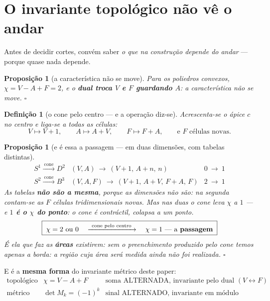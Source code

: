 \documentclass[11pt,a4paper]{article}
\newtheorem{proposicao}[teorema]{Proposição}
\newtheorem{definicao}{Definição}
\begin{document}
\section{O invariante topológico não vê o andar}\label{sec:euler}

Antes de decidir cortes, convém saber \emph{o que na construção depende do andar} ---
porque quase nada depende.

\begin{proposicao}[a característica não se move]\label{prop:euler}
Para os poliedros convexos, $\chi=V-A+F=2$, e o \textbf{dual troca $V$ e $F$
guardando $A$}: a característica não se move. $\square$
\end{proposicao}

\begin{definicao}[o cone pelo centro --- e a operação diz-se]\label{def:cone-centro}
Acrescenta-se o ápice $c$ no centro e liga-se a todas as células:
\[
V\mapsto V+1,\qquad A\mapsto A+V,\qquad F\mapsto F+A,
\qquad\text{e } F \text{ células novas.}
\]
\end{definicao}

\begin{proposicao}[e é essa a passagem --- em duas dimensões, com tabelas
distintas]\label{prop:passagem}
\[
\boxed{
\begin{array}{lll}
S^{1}\xrightarrow{\ \text{cone}\ }D^{2}
 & (V,A)\ \to\ (V{+}1,\,A{+}n,\,n)
 & 0\ \longrightarrow\ 1\\[3pt]
S^{2}\xrightarrow{\ \text{cone}\ }B^{3}
 & (V,A,F)\ \to\ (V{+}1,\,A{+}V,\,F{+}A,\,F)
 & 2\ \longrightarrow\ 1
\end{array}}
\]
As tabelas \textbf{não são a mesma}, porque as dimensões não são: na segunda
contam-se as $F$ células tridimensionais novas. Mas nas duas o cone leva $\chi$ a
$1$ --- e \textbf{$1$ é o $\chi$ do ponto}: o cone é contráctil, colapsa a
\emph{um} ponto.
\[
\boxed{\;\chi=2\ \text{ou}\ 0 \quad\xrightarrow{\ \text{cone pelo centro}\ }\quad
\chi=1\ \text{---\ a \textbf{passagem}}\;}
\]
É ela que faz as \textbf{áreas} existirem: sem o preenchimento produzido pelo cone temos
apenas a borda: a região cuja área será medida ainda não foi realizada. $\square$
\end{proposicao}

\noindent E é a \textbf{mesma forma} do invariante métrico deste paper:
\[
\boxed{
\begin{array}{lll}
\text{topológico} & \chi=V-A+F & \text{soma ALTERNADA, invariante pelo dual }(V\leftrightarrow F)\\[2pt]
\text{métrico} & \det M_k=(-1)^{k} & \text{sinal ALTERNADO, invariante em módulo pelo passo}
\end{array}}
\]
\end{document}
